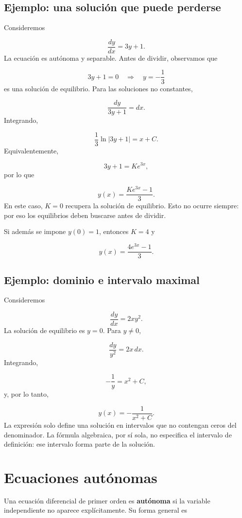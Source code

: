 \documentclass[12pt,a4paper]{article}
\begin{document}
	\clearpage
	\subsection{Ejemplo: una solución que puede perderse}

	Consideremos

	\[
	\frac{dy}{dx}=3y+1.
	\]
	La ecuación es autónoma y separable. Antes de dividir, observamos que

	\[
	3y+1=0
	\quad\Longrightarrow\quad
	y=-\frac13
	\]
	es una solución de equilibrio. Para las soluciones no constantes,

	\[
	\frac{dy}{3y+1}=dx.
	\]
	Integrando,

	\[
	\frac13\ln|3y+1|=x+C.
	\]
	Equivalentemente,

	\[
	3y+1=Ke^{3x},
	\]
	por lo que

	\[
	\boxed{y(x)=\frac{Ke^{3x}-1}{3}.}
	\]
	En este caso, \(K=0\) recupera la solución de equilibrio. Esto no ocurre siempre: por eso los equilibrios deben buscarse antes de dividir.

	Si además se impone \(y(0)=1\), entonces \(K=4\) y

	\[
	y(x)=\frac{4e^{3x}-1}{3}.
	\]

	\subsection{Ejemplo: dominio e intervalo maximal}

	Consideremos

	\[
	\frac{dy}{dx}=2xy^2.
	\]
	La solución de equilibrio es \(y=0\). Para \(y\neq0\),

	\[
	\frac{dy}{y^2}=2x\,dx.
	\]
	Integrando,

	\[
	-\frac{1}{y}=x^2+C,
	\]
	y, por lo tanto,

	\[
	\boxed{y(x)=-\frac{1}{x^2+C}.}
	\]
	La expresión solo define una solución en intervalos que no contengan ceros del denominador. La fórmula algebraica, por sí sola, no especifica el intervalo de definición: ese intervalo forma parte de la solución.

	\clearpage
	\section{Ecuaciones autónomas}

	Una ecuación diferencial de primer orden es \textbf{autónoma} si la variable independiente no aparece explícitamente. Su forma general es
\end{document}
